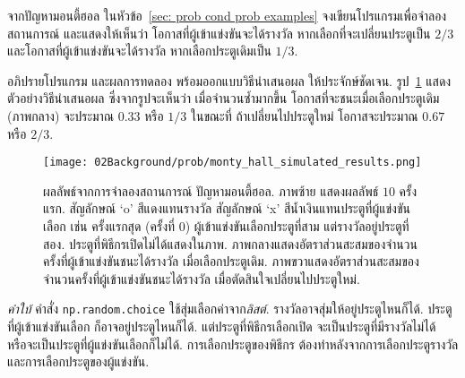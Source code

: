 \begin{Exercise}
	\label{ex: prob monty hall simulation}
	
	จากปัญหามอนตี้ฮอล ในหัวข้อ~\ref{sec: prob cond prob examples}
	จงเขียนโปรแกรมเพื่อจำลองสถานการณ์
	และแสดงให้เห็นว่า 
	โอกาสที่ผู้เข้าแข่งขันจะได้รางวัล  หากเลือกที่จะเปลี่ยนประตูเป็น $2/3$
	และโอกาสที่ผู้เข้าแข่งขันจะได้รางวัล  หากเลือกประตูเดิมเป็น $1/3$.
	
	อภิปรายโปรแกรม
	และผลการทดลอง
	พร้อมออกแบบวิธีนำเสนอผล
	ให้ประจักษ์ชัดเจน.
	รูป~\ref{fig: prob monty hall sim results}
	แสดงตัวอย่างวิธีนำเสนอผล
	ซึ่งจากรูปจะเห็นว่า
	เมื่อจำนวนซ้ำมากขึ้น
	โอกาสที่จะชนะเมื่อเลือกประตูเดิม (ภาพกลาง) จะประมาณ $0.33$ หรือ $1/3$
	ในขณะที่ ถ้าเปลี่ยนไปประตูใหม่
	โอกาสจะประมาณ $0.67$ หรือ $2/3$.
	
	\begin{figure}[H]
		\begin{center}
			\texttt{[image: 02Background/prob/monty\_hall\_simulated\_results.png]}
		\end{center}
		\caption[ผลการจำลองปัญหามอนตี้ฮอล]{ผลลัพธ์จากการจำลองสถานการณ์ ปัญหามอนตี้ฮอล. ภาพซ้าย แสดงผลลัพธ์ $10$ ครั้งแรก.
			สัญลักษณ์ `o' สีแดงแทนรางวัล
			สัญลักษณ์ `x' สีน้ำเงินแทนประตูที่ผู้แข่งขันเลือก เช่น ครั้งแรกสุด (ครั้งที่ $0$) ผู้เข้าแข่งขันเลือกประตูที่สาม แต่รางวัลอยู่ประตูที่สอง.
			ประตูที่พิธีกรเปิดไม่ได้แสดงในภาพ.
			ภาพกลางแสดงอัตราส่วนสะสมของจำนวนครั้งที่ผู้เข้าแข่งขันชนะได้รางวัล เมื่อเลือกประตูเดิม.
			ภาพขวาแสดงอัตราส่วนสะสมของจำนวนครั้งที่ผู้เข้าแข่งขันชนะได้รางวัล เมื่อตัดสินใจเปลี่ยนไปประตูใหม่.}
		\label{fig: prob monty hall sim results}
	\end{figure}
	
	\textit{คำใบ้}
	คำสั่ง \verb|np.random.choice|
	ใช้สุ่มเลือกค่าจาก\textit{ลิสต์}.
	รางวัลอาจสุ่มให้อยู่ประตูไหนก็ได้.
	ประตูที่ผู้เข้าแข่งขันเลือก ก็อาจอยู่ประตูไหนก็ได้.
	แต่ประตูที่พิธีกรเลือกเปิด
	จะเป็นประตูที่มีรางวัลไม่ได้
	หรือจะเป็นประตูที่ผู้แข่งขันเลือกก็ไม่ได้.
	การเลือกประตูของพิธีกร
	ต้องทำหลังจากการเลือกประตูรางวัล
	และการเลือกประตูของผู้แข่งขัน.
	
\end{Exercise}

